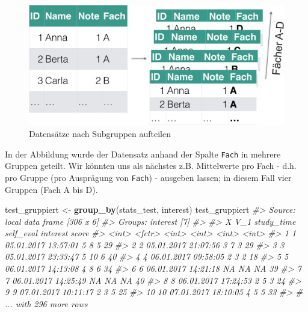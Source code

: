 \documentclass[12pt,ngerman,]{book}
\newenvironment{Shaded}{\begin{snugshade}}{\end{snugshade}}
\newcommand{\KeywordTok}[1]{\textcolor[rgb]{0.13,0.29,0.53}{\textbf{{#1}}}}
\newcommand{\StringTok}[1]{\textcolor[rgb]{0.31,0.60,0.02}{{#1}}}
\newcommand{\CommentTok}[1]{\textcolor[rgb]{0.56,0.35,0.01}{\textit{{#1}}}}
\newcommand{\NormalTok}[1]{{#1}}
\renewenvironment{Shaded}{\begin{kframe}}{\end{kframe}}
\begin{document}
\begin{figure}

{\centering \includegraphics[width=0.7\linewidth]{images/Datenjudo/group_by} 

}

\caption{Datensätze nach Subgruppen aufteilen}\label{fig:fig-groupby}
\end{figure}

In der Abbildung wurde der Datensatz anhand der Spalte \texttt{Fach} in
mehrere Gruppen geteilt. Wir könnten uns als nächstes z.B. Mittelwerte
pro Fach - d.h. pro Gruppe (pro Ausprägung von \texttt{Fach}) - ausgeben
lassen; in diesem Fall vier Gruppen (Fach A bis D).

\begin{Shaded}
\begin{Highlighting}[]
\NormalTok{test_gruppiert <-}\StringTok{ }\KeywordTok{group_by}\NormalTok{(stats_test, interest)}
\NormalTok{test_gruppiert}
\CommentTok{#> Source: local data frame [306 x 6]}
\CommentTok{#> Groups: interest [7]}
\CommentTok{#> }
\CommentTok{#>        X                 V_1 study_time self_eval interest score}
\CommentTok{#>    <int>              <fctr>      <int>     <int>    <int> <int>}
\CommentTok{#> 1      1 05.01.2017 13:57:01          5         8        5    29}
\CommentTok{#> 2      2 05.01.2017 21:07:56          3         7        3    29}
\CommentTok{#> 3      3 05.01.2017 23:33:47          5        10        6    40}
\CommentTok{#> 4      4 06.01.2017 09:58:05          2         3        2    18}
\CommentTok{#> 5      5 06.01.2017 14:13:08          4         8        6    34}
\CommentTok{#> 6      6 06.01.2017 14:21:18         NA        NA       NA    39}
\CommentTok{#> 7      7 06.01.2017 14:25:49         NA        NA       NA    40}
\CommentTok{#> 8      8 06.01.2017 17:24:53          2         5        3    24}
\CommentTok{#> 9      9 07.01.2017 10:11:17          2         3        5    25}
\CommentTok{#> 10    10 07.01.2017 18:10:05          4         5        5    33}
\CommentTok{#> # ... with 296 more rows}
\end{Highlighting}
\end{Shaded}
\end{document}
